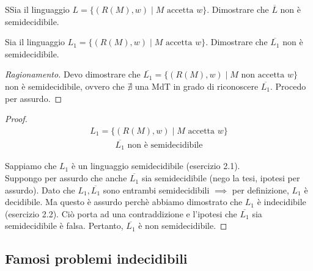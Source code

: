 \documentclass{article}  %
\theoremstyle{definition}
\newenvironment{ragionamento}[1][]
  {\begin{proof}[Ragionamento#1]\renewcommand{\qedsymbol}{}\normalfont}
  {\end{proof}}
\begin{document}
\begin{theorem}{}
	SSia il linguaggio $L = \{(R(M), w) \mid M \text{ accetta } w\}$. Dimostrare che $\overline{L}$ non è semidecidibile.
\end{theorem}
\begin{esercizio}[Esercizio 2.3]
	\footnotesize %
	Sia il linguaggio $L_1 = \{(R(M), w) \mid M \text{ accetta } w\}$. Dimostrare che $\overline{L_1}$ non è semidecidibile.
	\begin{ragionamento}
		Devo dimostrare che $\overline{L_1}=\{(R(M), w) \mid M \text{ non accetta } w\}$ non è semidecidibile, ovvero che $\nexists$ una MdT in grado
		di riconoscere $\overline{L_1}$. Procedo per assurdo.
	\end{ragionamento}
	\begin{proof}
		\begin{align*}
			L_1 = \{(R(M), w) \mid M \text{ accetta } w\} \tag*{(ipotesi)}
		\end{align*}
		\begin{align*}
			\overline{L_1} \text{ non è semidecidibile} \tag*{(tesi)}
		\end{align*}

		Sappiamo che $L_1$ è un linguaggio semidecidibile (esercizio 2.1). \\
		Suppongo per assurdo che anche $\overline{L_1}$ sia semidecidibile (nego la tesi, ipotesi per assurdo).
		Dato che $L_1, \overline{L_1}$ sono entrambi semidecidibili $\implies$ per definizione, $L_1$ è decidibile. Ma questo è assurdo perchè abbiamo dimostrato
		che $L_1$ è indecidibile (esercizio 2.2). Ciò porta ad una contraddizione e l'ipotesi che $\overline{L_1}$ sia semidecidibile è falsa.
		Pertanto, $\overline{L_1}$ è non semidecidibile.

	\end{proof}
\end{esercizio}
\break
\subsection{Famosi problemi indecidibili}
\end{document}
